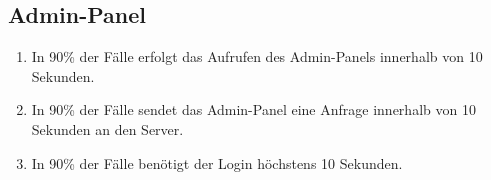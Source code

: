 \subsection*{Admin-Panel}

\begin{samepage}
    \begin{enumerate}[label=\textbf{/NFL\arabic*0/}, align=left, start=9]
        \item In 90\% der Fälle erfolgt das Aufrufen des \Gls{Admin-Panel}s innerhalb von 10 Sekunden.
        \item In 90\% der Fälle sendet das \Gls{Admin-Panel} eine Anfrage innerhalb von 10 Sekunden an den \Gls{Server}.
        \item In 90\% der Fälle benötigt der \Gls{Login} höchstens 10 Sekunden.
    \end{enumerate}
\end{samepage}